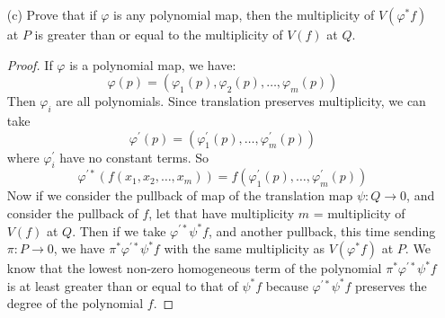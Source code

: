 \documentclass{article}
\begin{document}
\begin{itemize}
\begin{proof}
\begin{align*}
                    \end{align*}
                Then
                    \begin{align*}
                        \pi^{*}        &: k[x, y] \rightarrow k[x, y] \\
                        \pi^{*}f(x, y) &= f(x + p_{1}, y + p_{2})               
                    \end{align*}
                So $\pi^{*}f^{\prime}$ gives us that the multiplicity of $(0, 0)$ in $V(f^{\prime})$ is the multiplicity of $P$ in $V(\pi^{*}f^{\prime})$. But this is just:
                    \begin{equation*}
                        V(\pi^{*}\psi^{*}f) = V(\varphi^{*} f)
                    \end{equation*}
                where $\varphi$ translates $Q \rightarrow P$. So multiplicity is preserved under translation.
            \end{proof}

        \item [(c)] Prove that if $\varphi$ is any polynomial map, then the multiplicity of $V(\varphi^{*}f)$ at $P$ is greater than or equal to the multiplicity of $V(f)$ at $Q$. 
            \begin{proof}
                If $\varphi$ is a polynomial map, we have:
                    \begin{equation*}
                        \varphi(p) = (\varphi_{1}(p), \varphi_{2}(p), \ldots , \varphi_{m}(p))
                    \end{equation*}
                Then $\varphi_{i}$ are all polynomials. Since translation preserves multiplicity, we can take 
                    \begin{equation*}
                        \varphi^{\prime}(p) = (\varphi^{\prime}_{1}(p), \ldots , \varphi^{\prime}_{m}(p))
                    \end{equation*}
                where $\varphi_{i}^{\prime}$ have no constant terms. So 
                    \begin{equation*}
                        \varphi^{\prime{*}}(f(x_{1}, x_{2}, \ldots , x_{m})) = f(\varphi_{1}^{\prime}(p), \ldots , \varphi_{m}^{\prime}(p))
                    \end{equation*}
                Now if we consider the pullback of map of the translation map $\psi: Q \rightarrow 0$, and consider the pullback of $f$, let that have multiplicity $m$ = multiplicity of $V(f)$ at $Q$. Then if we take $\varphi^{\prime{*}}\psi^{*} f$, and another pullback, this time sending $\pi: P \rightarrow 0$, we have $\pi^{*}\varphi^{\prime{*}}\psi^{*} f$ with the same multiplicity as $V(\varphi^{*}f)$ at $P$. We know that the lowest non-zero homogeneous term of the polynomial $\pi^{*}\varphi^{\prime*}\psi^{*} f$ is at least greater than or equal to that of $\psi^{*} f$ because $\varphi^{\prime{*}}\psi^{*} f$ preserves the degree of the polynomial $f$.
            \end{proof}
    \end{itemize}
\end{document}
